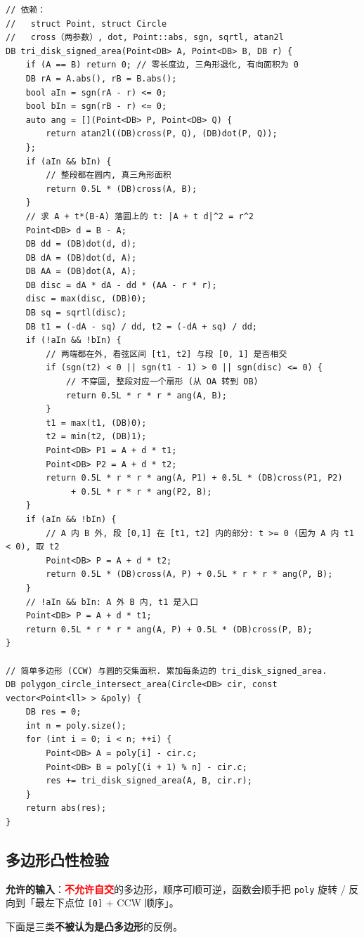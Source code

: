 		\begin{verbatim}
// 依赖：
//   struct Point, struct Circle
//   cross（两参数）, dot, Point::abs, sgn, sqrtl, atan2l
DB tri_disk_signed_area(Point<DB> A, Point<DB> B, DB r) {
	if (A == B) return 0; // 零长度边, 三角形退化, 有向面积为 0
	DB rA = A.abs(), rB = B.abs();
	bool aIn = sgn(rA - r) <= 0;
	bool bIn = sgn(rB - r) <= 0;
	auto ang = [](Point<DB> P, Point<DB> Q) {
		return atan2l((DB)cross(P, Q), (DB)dot(P, Q));
	};
	if (aIn && bIn) {
		// 整段都在圆内, 真三角形面积
		return 0.5L * (DB)cross(A, B);
	}
	// 求 A + t*(B-A) 落圆上的 t: |A + t d|^2 = r^2
	Point<DB> d = B - A;
	DB dd = (DB)dot(d, d);
	DB dA = (DB)dot(d, A);
	DB AA = (DB)dot(A, A);
	DB disc = dA * dA - dd * (AA - r * r);
	disc = max(disc, (DB)0);
	DB sq = sqrtl(disc);
	DB t1 = (-dA - sq) / dd, t2 = (-dA + sq) / dd;
	if (!aIn && !bIn) {
		// 两端都在外, 看弦区间 [t1, t2] 与段 [0, 1] 是否相交
		if (sgn(t2) < 0 || sgn(t1 - 1) > 0 || sgn(disc) <= 0) {
			// 不穿圆, 整段对应一个扇形 (从 OA 转到 OB)
			return 0.5L * r * r * ang(A, B);
		}
		t1 = max(t1, (DB)0);
		t2 = min(t2, (DB)1);
		Point<DB> P1 = A + d * t1;
		Point<DB> P2 = A + d * t2;
		return 0.5L * r * r * ang(A, P1) + 0.5L * (DB)cross(P1, P2)
		     + 0.5L * r * r * ang(P2, B);
	}
	if (aIn && !bIn) {
		// A 内 B 外, 段 [0,1] 在 [t1, t2] 内的部分: t >= 0 (因为 A 内 t1 < 0), 取 t2
		Point<DB> P = A + d * t2;
		return 0.5L * (DB)cross(A, P) + 0.5L * r * r * ang(P, B);
	}
	// !aIn && bIn: A 外 B 内, t1 是入口
	Point<DB> P = A + d * t1;
	return 0.5L * r * r * ang(A, P) + 0.5L * (DB)cross(P, B);
}

// 简单多边形 (CCW) 与圆的交集面积. 累加每条边的 tri_disk_signed_area.
DB polygon_circle_intersect_area(Circle<DB> cir, const vector<Point<ll> > &poly) {
	DB res = 0;
	int n = poly.size();
	for (int i = 0; i < n; ++i) {
		Point<DB> A = poly[i] - cir.c;
		Point<DB> B = poly[(i + 1) % n] - cir.c;
		res += tri_disk_signed_area(A, B, cir.r);
	}
	return abs(res);
}
		\end{verbatim}

		\subsection{多边形凸性检验}

		\textbf{允许的输入}：\textcolor{red}{\textbf{不允许自交}}的多边形，顺序可顺可逆，函数会顺手把 \texttt{poly} 旋转 / 反向到「最左下点位 \texttt{[0]} + CCW 顺序」。

		下面是三类\textbf{不被认为是凸多边形}的反例。

